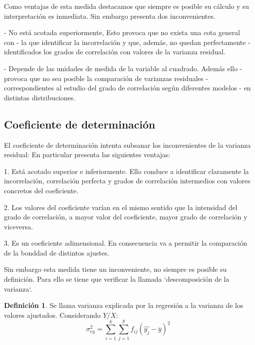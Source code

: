 \documentclass{article}
\theoremstyle{definition}
\newtheorem{definition}{Definición}[section]
\begin{document}
Como ventajas de esta medida destacamos que siempre es posible su cálculo y su
interpretación es inmediata. Sin embargo presenta dos inconvenientes.

\vspace{2mm}

- No está acotada superiormente, Esto provoca que no exista una cota general con
- la que identificar la incorrelación y que, además, no quedan perfectamente
- identificados los grados de correlación con valores de la varianza residual.

\vspace{2mm}

- Depende de las unidades de medida de la variable al cuadrado. Además ello
- provoca que no sea posible la comparación de varianzas residuales
- correspondientes al estudio del grado de correlación según diferentes modelos
- en distintas distribuciones.

\subsection{Coeficiente de determinación}

	El coeficiente de determinación intenta subsanar los inconvenientes de la
	varianza residual: En particular presenta las siguientes ventajas:
	\vspace{2mm}

	1. Está acotado superior e inferiormente. Ello conduce a identificar
	claramente la incorrelación, correlación perfecta y grados de correlación
	intermedios con valores concretos del coeficiente.

	\vspace{2mm}

	2. Los valores del coeficiente varían en el mismo sentido que la intensidad del
	grado de correlación, a mayor valor del coeficiente, mayor grado de
	correlación y viceversa.

	\vspace{2mm}

	3. Es un coeficiente adimensional. En consecuencia va a permitir la
	comparación de la bonddad de distintos ajustes.

	\vspace{2mm}

	Sin embargo esta medida tiene un inconveniente, no siempre es posible su
	definición. Para ello se tiene que verificar la llamada `descomposición de la
	varianza`.

	\begin{definition}
		Se llama varianza explicada por la regresión a la varianza de los
		valores ajustados. Considerando $Y/X$:
		$$
		\sigma_{ey}^2 = \sum_{i=1}^k\sum_{j=1}^p f_{ij}(\hat{y_j}-\overline{y})^2
		$$
	\end{definition}
\end{document}
